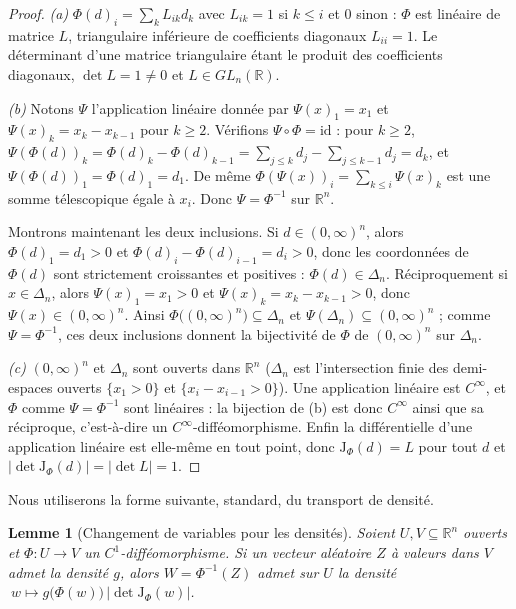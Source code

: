 \documentclass[11pt,a4paper]{article}
\theoremstyle{plain}
\newtheorem{lemme}[theoreme]{Lemme}
\theoremstyle{definition}
\theoremstyle{remark}
\newcommand{\R}{\mathbb{R}}
\newcommand{\Jac}{\mathrm{J}}
\begin{document}
\begin{proof}
\emph{(a)} $\Phi(d)_i=\sum_k L_{ik}d_k$ avec $L_{ik}=1$ si $k\le i$ et $0$
sinon : $\Phi$ est linéaire de matrice $L$, triangulaire inférieure de
coefficients diagonaux $L_{ii}=1$. Le déterminant d'une matrice triangulaire
étant le produit des coefficients diagonaux, $\det L=1\ne0$ et $L\in GL_n(\R)$.

\emph{(b)} Notons $\Psi$ l'application linéaire donnée par $\Psi(x)_1=x_1$ et
$\Psi(x)_k=x_k-x_{k-1}$ pour $k\ge2$. Vérifions $\Psi\circ\Phi=\mathrm{id}$ :
pour $k\ge2$,
$\Psi(\Phi(d))_k=\Phi(d)_k-\Phi(d)_{k-1}=\sum_{j\le k}d_j-\sum_{j\le k-1}d_j=d_k$,
et $\Psi(\Phi(d))_1=\Phi(d)_1=d_1$. De même $\Phi(\Psi(x))_i=\sum_{k\le i}\Psi(x)_k$
est une somme télescopique égale à $x_i$. Donc $\Psi=\Phi^{-1}$ sur $\R^n$.

Montrons maintenant les deux inclusions. Si $d\in(0,\infty)^n$, alors
$\Phi(d)_1=d_1>0$ et $\Phi(d)_i-\Phi(d)_{i-1}=d_i>0$, donc les coordonnées de
$\Phi(d)$ sont strictement croissantes et positives : $\Phi(d)\in\Delta_n$.
Réciproquement si $x\in\Delta_n$, alors $\Psi(x)_1=x_1>0$ et
$\Psi(x)_k=x_k-x_{k-1}>0$, donc $\Psi(x)\in(0,\infty)^n$. Ainsi
$\Phi\bigl((0,\infty)^n\bigr)\subseteq\Delta_n$ et
$\Psi(\Delta_n)\subseteq(0,\infty)^n$ ; comme $\Psi=\Phi^{-1}$, ces deux
inclusions donnent la bijectivité de $\Phi$ de $(0,\infty)^n$ sur $\Delta_n$.

\emph{(c)} $(0,\infty)^n$ et $\Delta_n$ sont ouverts dans $\R^n$ ($\Delta_n$ est
l'intersection finie des demi-espaces ouverts $\{x_1>0\}$ et
$\{x_i-x_{i-1}>0\}$). Une application linéaire est $C^\infty$, et $\Phi$ comme
$\Psi=\Phi^{-1}$ sont linéaires : la bijection de (b) est donc $C^\infty$ ainsi
que sa réciproque, c'est-à-dire un $C^\infty$-difféomorphisme. Enfin la
différentielle d'une application linéaire est elle-même en tout point, donc
$\Jac_\Phi(d)=L$ pour tout $d$ et $|\det \Jac_\Phi(d)|=|\det L|=1$.
\end{proof}

Nous utiliserons la forme suivante, standard, du transport de densité.

\begin{lemme}[Changement de variables pour les densités]\label{lem:cdv}
Soient $U,V\subseteq\R^n$ ouverts et $\Phi:U\to V$ un $C^1$-difféomorphisme. Si un
vecteur aléatoire $Z$ à valeurs dans $V$ admet la densité $g$, alors
$W=\Phi^{-1}(Z)$ admet sur $U$ la densité
$\ w\mapsto g\bigl(\Phi(w)\bigr)\,\bigl|\det \Jac_\Phi(w)\bigr|$.
\end{lemme}
\end{document}

